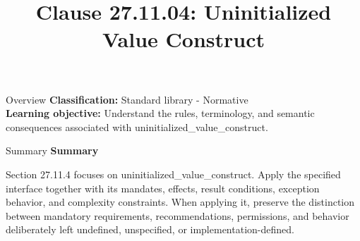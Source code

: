 \documentclass[10pt,letterpaper]{article}
\title{Clause 27.11.04: Uninitialized Value Construct}
\author{}
\date{}
\begin{document}
\maketitle
\begin{CornellOverviewBox}{Overview}
\textbf{Classification:} Standard library - Normative\\[2pt]
\textbf{Learning objective:} Understand the rules, terminology, and semantic consequences associated with uninitialized\_value\_construct.
\end{CornellOverviewBox}\begin{CornellSummaryBox}{Summary}
{\sffamily\bfseries\color{Accent} Summary}\par\vspace{3pt}Section 27.11.4 focuses on uninitialized\_value\_construct. Apply the specified interface together with its mandates, effects, result conditions, exception behavior, and complexity constraints. When applying it, preserve the distinction between mandatory requirements, recommendations, permissions, and behavior deliberately left undefined, unspecified, or implementation-defined.
\end{CornellSummaryBox}
\end{document}
